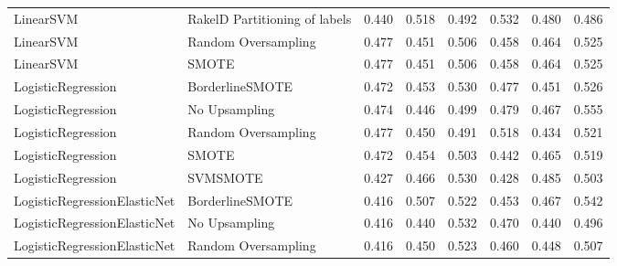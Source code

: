 \begin{tabular}{llllllll}
                      LinearSVM & RakelD Partitioning of labels & 0.440 &                     0.518 &                 0.492 &                  0.532 &                                   0.480 &     0.486 \\
                      LinearSVM &           Random Oversampling & 0.477 &                     0.451 &                 0.506 &                  0.458 &                                   0.464 &     0.525 \\
                      LinearSVM &                         SMOTE & 0.477 &                     0.451 &                 0.506 &                  0.458 &                                   0.464 &     0.525 \\
             LogisticRegression &               BorderlineSMOTE & 0.472 &                     0.453 &                 0.530 &                  0.477 &                                   0.451 &     0.526 \\
             LogisticRegression &                 No Upsampling & 0.474 &                     0.446 &                 0.499 &                  0.479 &                                   0.467 &     0.555 \\
             LogisticRegression &           Random Oversampling & 0.477 &                     0.450 &                 0.491 &                  0.518 &                                   0.434 &     0.521 \\
             LogisticRegression &                         SMOTE & 0.472 &                     0.454 &                 0.503 &                  0.442 &                                   0.465 &     0.519 \\
             LogisticRegression &                      SVMSMOTE & 0.427 &                     0.466 &                 0.530 &                  0.428 &                                   0.485 &     0.503 \\
   LogisticRegressionElasticNet &               BorderlineSMOTE & 0.416 &                     0.507 &                 0.522 &                  0.453 &                                   0.467 &     0.542 \\
   LogisticRegressionElasticNet &                 No Upsampling & 0.416 &                     0.440 &                 0.532 &                  0.470 &                                   0.440 &     0.496 \\
   LogisticRegressionElasticNet &           Random Oversampling & 0.416 &                     0.450 &                 0.523 &                  0.460 &                                   0.448 &     0.507 \\

\end{tabular}
